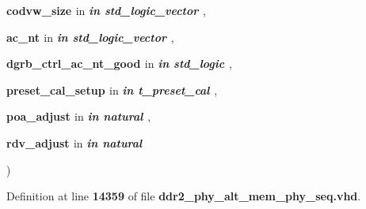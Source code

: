 {\begin{DoxyParamCaption}
\item[{}]{{\bfseries \textcolor{vhdlchar}{codvw\+\_\+size}\textcolor{vhdlchar}{ }}\textcolor{stringliteral}{in} {\em {\bfseries \textcolor{keywordflow}{in}\textcolor{vhdlchar}{ }\textcolor{comment}{std\+\_\+logic\+\_\+vector}\textcolor{vhdlchar}{ }\textcolor{vhdlchar}{ }\textcolor{vhdlchar}{ }}} , }
\item[{}]{{\bfseries \textcolor{vhdlchar}{ac\+\_\+nt}\textcolor{vhdlchar}{ }}\textcolor{stringliteral}{in} {\em {\bfseries \textcolor{keywordflow}{in}\textcolor{vhdlchar}{ }\textcolor{comment}{std\+\_\+logic\+\_\+vector}\textcolor{vhdlchar}{ }\textcolor{vhdlchar}{ }\textcolor{vhdlchar}{ }}} , }
\item[{}]{{\bfseries {\bfseries {\bf dgrb\+\_\+ctrl\+\_\+ac\+\_\+nt\+\_\+good}} \textcolor{vhdlchar}{ }}\textcolor{stringliteral}{in} {\em {\bfseries \textcolor{keywordflow}{in}\textcolor{vhdlchar}{ }\textcolor{comment}{std\+\_\+logic}\textcolor{vhdlchar}{ }\textcolor{vhdlchar}{ }\textcolor{vhdlchar}{ }}} , }
\item[{}]{{\bfseries \textcolor{vhdlchar}{preset\+\_\+cal\+\_\+setup}\textcolor{vhdlchar}{ }}\textcolor{stringliteral}{in} {\em {\bfseries \textcolor{keywordflow}{in}\textcolor{vhdlchar}{ }\textcolor{vhdlchar}{t\+\_\+preset\+\_\+cal}\textcolor{vhdlchar}{ }\textcolor{vhdlchar}{ }\textcolor{vhdlchar}{ }}} , }
\item[{}]{{\bfseries \textcolor{vhdlchar}{poa\+\_\+adjust}\textcolor{vhdlchar}{ }}\textcolor{stringliteral}{in} {\em {\bfseries \textcolor{keywordflow}{in}\textcolor{vhdlchar}{ }\textcolor{comment}{natural}\textcolor{vhdlchar}{ }\textcolor{vhdlchar}{ }\textcolor{vhdlchar}{ }}} , }
\item[{}]{{\bfseries \textcolor{vhdlchar}{rdv\+\_\+adjust}\textcolor{vhdlchar}{ }}\textcolor{stringliteral}{in} {\em {\bfseries \textcolor{keywordflow}{in}\textcolor{vhdlchar}{ }\textcolor{comment}{natural}\textcolor{vhdlchar}{ }\textcolor{vhdlchar}{ }\textcolor{vhdlchar}{ }}}}
\end{DoxyParamCaption}
)\hspace{0.3cm}{\ttfamily [Function]}}\label{classddr2__phy__alt__mem__phy__seq_1_1struct_ae2a1cb0d650bd044bdc20fa464946f43}


Definition at line {\bf 14359} of file {\bf ddr2\+\_\+phy\+\_\+alt\+\_\+mem\+\_\+phy\+\_\+seq.\+vhd}.

